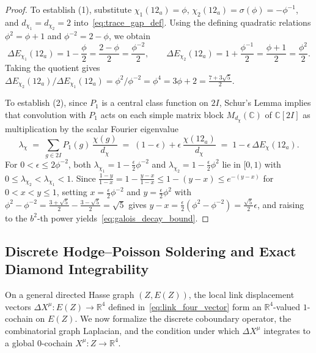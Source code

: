 \documentclass[11pt,a4paper]{article}
\theoremstyle{definition}
\theoremstyle{remark}
\newcommand{\R}{\mathbb{R}}
\newcommand{\C}{\mathbb{C}}
\begin{document}
\begin{proof}
To establish (1), substitute $\chi_1(12_a) = \phi$, $\chi_2(12_a) = \sigma(\phi) = -\phi^{-1}$, and $d_{\chi_1} = d_{\chi_2} = 2$ into~\eqref{eq:trace_gap_def}. Using the defining quadratic relations $\phi^2 = \phi + 1$ and $\phi^{-2} = 2 - \phi$, we obtain
\[
\Delta E_{\chi_1}(12_a) = 1 - \frac{\phi}{2} = \frac{2 - \phi}{2} = \frac{\phi^{-2}}{2}, \qquad
\Delta E_{\chi_2}(12_a) = 1 + \frac{\phi^{-1}}{2} = \frac{\phi + 1}{2} = \frac{\phi^2}{2}.
\]
Taking the quotient gives $\Delta E_{\chi_2}(12_a) / \Delta E_{\chi_1}(12_a) = \phi^2 / \phi^{-2} = \phi^4 = 3\phi + 2 = \frac{7+3\sqrt{5}}{2}$.

To establish (2), since $P_1$ is a central class function on $2I$, Schur's Lemma implies that convolution with $P_1$ acts on each simple matrix block $M_{d_\chi}(\C)$ of $\C[2I]$ as multiplication by the scalar Fourier eigenvalue
\[
\lambda_\chi \;=\; \sum_{g \in 2I} P_1(g)\,\frac{\chi(g)}{d_\chi} \;=\; (1 - \epsilon) + \epsilon\,\frac{\chi(12_a)}{d_\chi} \;=\; 1 - \epsilon\,\Delta E_\chi(12_a).
\]
For $0 < \epsilon \le 2\phi^{-2}$, both $\lambda_{\chi_1} = 1 - \frac{\epsilon}{2}\phi^{-2}$ and $\lambda_{\chi_2} = 1 - \frac{\epsilon}{2}\phi^2$ lie in $[0, 1)$ with $0 \le \lambda_{\chi_2} < \lambda_{\chi_1} < 1$. Since $\frac{1 - y}{1 - x} = 1 - \frac{y - x}{1 - x} \le 1 - (y - x) \le e^{-(y - x)}$ for $0 < x < y \le 1$, setting $x = \frac{\epsilon}{2}\phi^{-2}$ and $y = \frac{\epsilon}{2}\phi^2$ with $\phi^2 - \phi^{-2} = \frac{3+\sqrt{5}}{2} - \frac{3-\sqrt{5}}{2} = \sqrt{5}$ gives $y - x = \frac{\epsilon}{2}(\phi^2 - \phi^{-2}) = \frac{\sqrt{5}}{2}\epsilon$, and raising to the $b^2$-th power yields~\eqref{eq:galois_decay_bound}.
\end{proof}

\subsection{Discrete Hodge--Poisson Soldering and Exact Diamond Integrability}

On a general directed Hasse graph $(Z, E(Z))$, the local link displacement vectors $\Delta X^\mu : E(Z) \to \R^4$ defined in~\eqref{eq:link_four_vector} form an $\R^4$-valued $1$-cochain on $E(Z)$. We now formalize the discrete coboundary operator, the combinatorial graph Laplacian, and the condition under which $\Delta X^\mu$ integrates to a global $0$-cochain $X^\mu : Z \to \R^4$.
\end{document}
